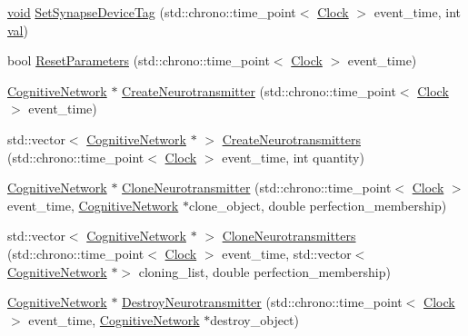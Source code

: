 \begin{DoxyCompactItemize}
\item 
\mbox{\hyperlink{glad_8h_a950fc91edb4504f62f1c577bf4727c29}{void}} \mbox{\hyperlink{class_synapse_a702c08b1ee4389382a5890d8c19aee9c}{Set\+Synapse\+Device\+Tag}} (std\+::chrono\+::time\+\_\+point$<$ \mbox{\hyperlink{universe_8h_a0ef8d951d1ca5ab3cfaf7ab4c7a6fd80}{Clock}} $>$ event\+\_\+time, int \mbox{\hyperlink{glad_8h_a26942fd2ed566ef553eae82d2c109c8f}{val}})
\item 
bool \mbox{\hyperlink{class_synapse_a5b2bbc3553e92492a5c38d1d797fcd92}{Reset\+Parameters}} (std\+::chrono\+::time\+\_\+point$<$ \mbox{\hyperlink{universe_8h_a0ef8d951d1ca5ab3cfaf7ab4c7a6fd80}{Clock}} $>$ event\+\_\+time)
\item 
\mbox{\hyperlink{class_cognitive_network}{Cognitive\+Network}} $\ast$ \mbox{\hyperlink{class_synapse_aef4c17534bc93b31de8e81c1ad138b7b}{Create\+Neurotransmitter}} (std\+::chrono\+::time\+\_\+point$<$ \mbox{\hyperlink{universe_8h_a0ef8d951d1ca5ab3cfaf7ab4c7a6fd80}{Clock}} $>$ event\+\_\+time)
\item 
std\+::vector$<$ \mbox{\hyperlink{class_cognitive_network}{Cognitive\+Network}} $\ast$ $>$ \mbox{\hyperlink{class_synapse_a593c70925fb80b880c6a01f2f252eb22}{Create\+Neurotransmitters}} (std\+::chrono\+::time\+\_\+point$<$ \mbox{\hyperlink{universe_8h_a0ef8d951d1ca5ab3cfaf7ab4c7a6fd80}{Clock}} $>$ event\+\_\+time, int quantity)
\item 
\mbox{\hyperlink{class_cognitive_network}{Cognitive\+Network}} $\ast$ \mbox{\hyperlink{class_synapse_a1b52aa12cc7c28bfa2564e21ac17eb07}{Clone\+Neurotransmitter}} (std\+::chrono\+::time\+\_\+point$<$ \mbox{\hyperlink{universe_8h_a0ef8d951d1ca5ab3cfaf7ab4c7a6fd80}{Clock}} $>$ event\+\_\+time, \mbox{\hyperlink{class_cognitive_network}{Cognitive\+Network}} $\ast$clone\+\_\+object, double perfection\+\_\+membership)
\item 
std\+::vector$<$ \mbox{\hyperlink{class_cognitive_network}{Cognitive\+Network}} $\ast$ $>$ \mbox{\hyperlink{class_synapse_a97c0db103754d337e28591f185c8379f}{Clone\+Neurotransmitters}} (std\+::chrono\+::time\+\_\+point$<$ \mbox{\hyperlink{universe_8h_a0ef8d951d1ca5ab3cfaf7ab4c7a6fd80}{Clock}} $>$ event\+\_\+time, std\+::vector$<$ \mbox{\hyperlink{class_cognitive_network}{Cognitive\+Network}} $\ast$$>$ cloning\+\_\+list, double perfection\+\_\+membership)
\item 
\mbox{\hyperlink{class_cognitive_network}{Cognitive\+Network}} $\ast$ \mbox{\hyperlink{class_synapse_a8d53488bdd8f0bd97216e5d388df35b8}{Destroy\+Neurotransmitter}} (std\+::chrono\+::time\+\_\+point$<$ \mbox{\hyperlink{universe_8h_a0ef8d951d1ca5ab3cfaf7ab4c7a6fd80}{Clock}} $>$ event\+\_\+time, \mbox{\hyperlink{class_cognitive_network}{Cognitive\+Network}} $\ast$destroy\+\_\+object)
$$
\end{DoxyCompactItemize}
